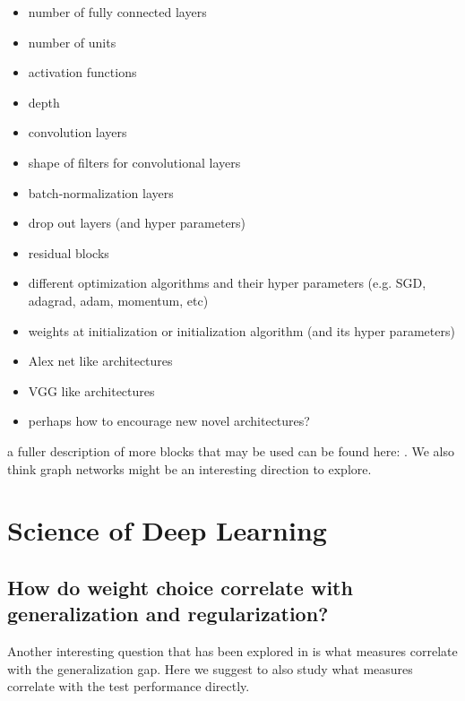 \documentclass{article}
\begin{document}
\begin{itemize}
    \item number of fully connected layers
    \item number of units
    \item activation functions
    \item depth
    \item convolution layers
    \item shape of filters for convolutional layers
    \item batch-normalization layers
    \item drop out layers (and hyper parameters)
    \item residual blocks
    \item different optimization algorithms and their hyper parameters (e.g. SGD, adagrad, adam, momentum, etc)
    \item weights at initialization or initialization algorithm (and its hyper parameters)
    \item Alex net like architectures
    \item VGG like architectures
    \item perhaps how to encourage new novel architectures?
\end{itemize}

a fuller description of more blocks that may be used can be found here: \cite{relational}.
We also think graph networks might be an interesting direction to explore.

\section{Science of Deep Learning}

\subsection{How do weight choice correlate with generalization and regularization?}

Another interesting question that has been explored in \cite{margin,linear} is what measures correlate with the generalization gap. 
Here we suggest to also study what measures correlate with the test performance directly. 

\end{document}
